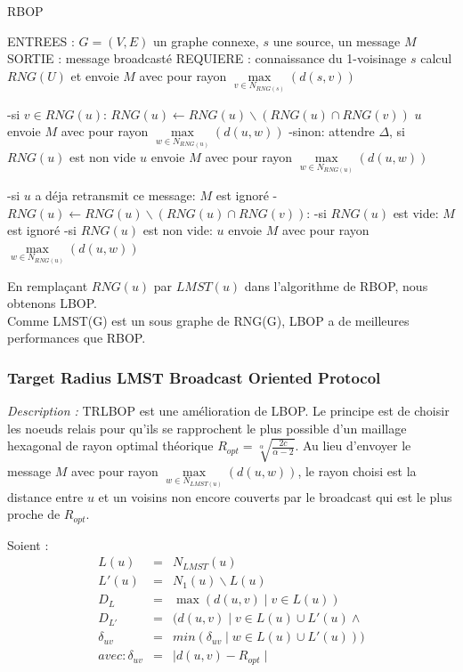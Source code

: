 \begin{algorithm}[H]
\caption{RBOP}
\label{algo_RBOP}
\begin{algorithmic}
\STATE ENTREES : $G=(V,E)$ un graphe connexe, $s$ une source, un message $M$
\STATE SORTIE : message broadcasté
\STATE REQUIERE : connaissance du 1-voisinage
\STATE $s$ calcul $RNG(U)$ et envoie $M$ avec pour rayon $\max\limits_{v\in N_{RNG(s)}}(d(s,v))$

		\STATE -si $v\in RNG(u)$: $RNG(u)\leftarrow RNG(u)\backslash(RNG(u)\cap RNG(v))$ $u$ envoie $M$ avec pour rayon $\max\limits_{w\in N_{RNG(u)}}(d(u,w))$
		\STATE -sinon: attendre $\Delta$, si $RNG(u)$ est non vide  $u$ envoie $M$ avec pour rayon $\max\limits_{w\in N_{RNG(u)}}(d(u,w))$
			 	
	\ENDIF
		\STATE -si $u$ a déja retransmit ce message: $M$ est ignoré
		\STATE -$RNG(u)\leftarrow RNG(u)\backslash(RNG(u)\cap RNG(v))$:
		\INDSTATE   -si $RNG(u)$ est vide: $M$ est ignoré
		\INDSTATE   -si $RNG(u)$ est non vide: $u$ envoie $M$ avec pour rayon $\max\limits_{w\in N_{RNG(u)}}(d(u,w))$
			 	
	\ENDIF

\ENDIF
\end{algorithmic}
\end{algorithm}

En remplaçant $RNG(u)$ par $LMST(u)$ dans l'algorithme de RBOP, nous obtenons LBOP.\\

Comme LMST(G) est un sous graphe de RNG(G), LBOP a de meilleures performances que RBOP.

\subsubsection{Target Radius LMST Broadcast Oriented Protocol \cite{Ingelrest2004}}

\emph{Description :} TRLBOP est une amélioration de LBOP. Le principe est de choisir les noeuds relais pour qu'ils se rapprochent le plus possible d'un maillage hexagonal de rayon optimal théorique $R_{opt}=\sqrt[\alpha]{\frac{2c}{\alpha-2}}$. Au lieu d'envoyer le message $M$ avec pour rayon $\max\limits_{w\in N_{LMST(u)}}(d(u,w))$, le rayon choisi est la distance entre $u$ et un voisins non encore couverts par le broadcast qui est le plus proche de $R_{opt}$.


Soient :
\begin{eqnarray*}
L(u) & = & N_{LMST}(u) \label{eq:3}\\
L'(u) & = & N_1(u)\backslash L(u)\\
D_L & = & \max(d(u,v)\mid v \in L(u))\\
D_{L'} & = & (d(u,v)\mid v \in L(u)\cup L'(u)\wedge  \\
\delta_{uv} & = & min(\delta_{uv}\mid w \in L(u)\cup L'(u)))  \\
avec: \delta_{uv} & = & \mid d(u,v)-R_{opt}\mid  \label{eq:4}
\end{eqnarray*} 

